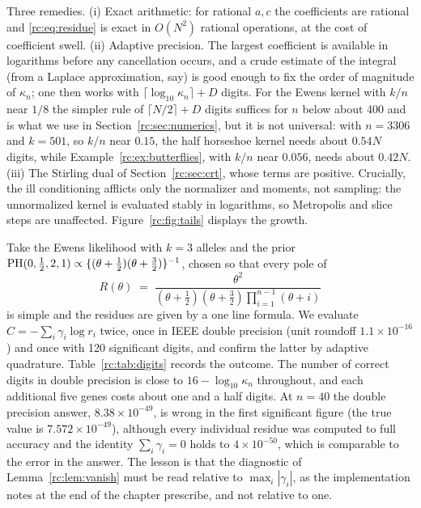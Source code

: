 Three remedies. (i) Exact arithmetic: for rational $a,c$ the coefficients are rational and \eqref{rc:eq:residue} is exact in $O(N^2)$ rational operations, at the cost of coefficient swell. (ii) Adaptive precision. The largest coefficient is available in logarithms before any cancellation occurs, and a crude estimate of the integral (from a Laplace approximation, say) is good enough to fix the order of magnitude of $\kappa_n$; one then works with $\lceil\log_{10}\kappa_n\rceil+D$ digits. For the Ewens kernel with $k/n$ near $1/8$ the simpler rule of $\lceil N/2\rceil+D$ digits suffices for $n$ below about 400 and is what we use in Section~\ref{rc:sec:numerics}, but it is not universal: with $n=3306$ and $k=501$, so $k/n$ near $0.15$, the half horseshoe kernel needs about $0.54N$ digits, while Example~\ref{rc:ex:butterflies}, with $k/n$ near $0.056$, needs about $0.42N$. (iii) The Stirling dual of Section~\ref{rc:sec:crt}, whose terms are positive. Crucially, the ill conditioning afflicts only the normalizer and moments, not sampling: the unnormalized kernel is evaluated stably in logarithms, so Metropolis and slice steps are unaffected. Figure~\ref{rc:fig:tails} displays the growth.

\begin{example}\label{rc:ex:digits}
Take the Ewens likelihood with $k=3$ alleles and the prior $\mathrm{PH}(0,\frac12,2,1)\propto\{(\theta+\frac12)(\theta+\frac32)\}^{-1}$, chosen so that every pole of
\[
R(\theta)\;=\;\frac{\theta^{2}}{(\theta+\frac12)(\theta+\frac32)\prod_{i=1}^{n-1}(\theta+i)}
\]
is simple and the residues are given by a one line formula. We evaluate $C=-\sum_i\gamma_i\log r_i$ twice, once in IEEE double precision (unit roundoff $1.1\times10^{-16}$) and once with 120 significant digits, and confirm the latter by adaptive quadrature. Table~\ref{rc:tab:digits} records the outcome. The number of correct digits in double precision is close to $16-\log_{10}\kappa_n$ throughout, and each additional five genes costs about one and a half digits. At $n=40$ the double precision answer, $8.38\times10^{-49}$, is wrong in the first significant figure (the true value is $7.572\times10^{-49}$), although every individual residue was computed to full accuracy and the identity $\sum_i\gamma_i=0$ holds to $4\times10^{-50}$, which is comparable to the error in the answer. The lesson is that the diagnostic of Lemma~\ref{rc:lem:vanish} must be read relative to $\max_i|\gamma_i|$, as the implementation notes at the end of the chapter prescribe, and not relative to one.
\end{example}

